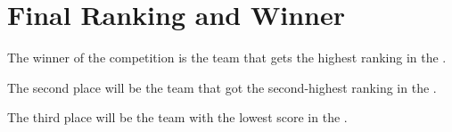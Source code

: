 \section{Final Ranking and Winner}

The winner of the competition is the team that gets the highest ranking in the .

The second place will be the team that got the second-highest ranking in the .

The third place will be the team with the lowest score in the .


